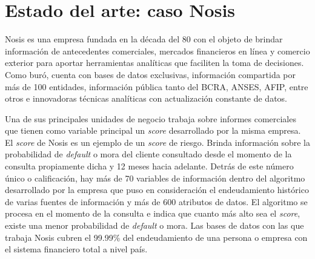 




\section{Estado del arte: caso Nosis}

Nosis es una empresa fundada en la década del 80 con el objeto de brindar información de antecedentes comerciales, mercados financieros en línea y comercio exterior para aportar herramientas analíticas que faciliten la toma de decisiones.
Como buró, cuenta con bases de datos exclusivas, información compartida por más de 100 entidades, información pública tanto del BCRA, ANSES, AFIP, entre otros  e innovadoras técnicas analíticas con actualización constante de datos. 

Una de sus principales unidades de negocio trabaja sobre informes comerciales que tienen como variable principal un \textit{score} desarrollado por la misma empresa. 
El \textit{score} de Nosis es un ejemplo de un \textit{score} de riesgo. Brinda información sobre la probabilidad de \textit{default} o mora del cliente consultado desde el momento de la consulta propiamente dicha y 12 meses hacia adelante. Detrás de este número único o calificación, hay más de 70 variables de información dentro del algoritmo desarrollado por la empresa que puso en consideración el endeudamiento histórico de varias fuentes de información y más de 600 atributos de datos. El algoritmo se procesa en el momento de la consulta e indica que cuanto más alto sea el \textit{score}, existe una menor probabilidad de \textit{default} o mora.  
Las bases de datos con las que trabaja Nosis cubren el 99.99\% del endeudamiento de una persona o empresa con el sistema financiero total a nivel país. 

